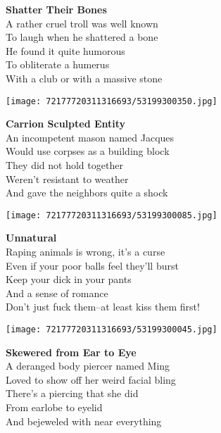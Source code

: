 \documentclass[10pt,letterpaper]{article}
\begin{document}
\begin{center}
\textbf{Shatter Their Bones}\\
\vskip 0.2in
A rather cruel troll was well known\\
To laugh when he shattered a bone\\
He found it quite humorous\\
To obliterate a humerus\\
With a club or with a massive stone\\
\end{center}
\pagebreak

\begin{center}\texttt{[image: 72177720311316693/53199300350.jpg]}
\end{center}
\begin{center}
\textbf{Carrion Sculpted Entity}\\
\vskip 0.2in
An incompetent mason named Jacques\\
Would use corpses as a building block\\
They did not hold together\\
Weren't resistant to weather\\
And gave the neighbors quite a shock\\
\end{center}
\pagebreak

\begin{center}\texttt{[image: 72177720311316693/53199300085.jpg]}
\end{center}
\begin{center}
\textbf{Unnatural}\\
\vskip 0.2in
Raping animals is wrong, it's a curse\\
Even if your poor balls feel they'll burst\\
Keep your dick in your pants\\
And a sense of romance\\
Don't just fuck them--at least kiss them first!\\
\end{center}
\pagebreak

\begin{center}\texttt{[image: 72177720311316693/53199300045.jpg]}
\end{center}
\begin{center}
\textbf{Skewered from Ear to Eye}\\
\vskip 0.2in
A deranged body piercer named Ming\\
Loved to show off her weird facial bling\\
There's a piercing that she did\\
From earlobe to eyelid\\
And bejeweled with near everything\\
\end{center}
\pagebreak
\end{document}
